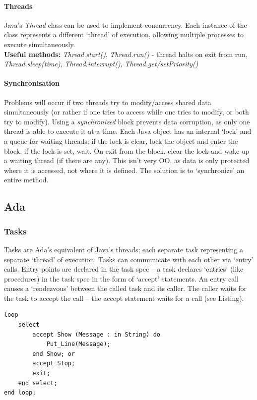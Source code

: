 \documentclass[a4paper,oneside]{report}
\begin{document}
      		\paragraph{Threads} Java's \emph{Thread} class can be used to implement concurrency. Each instance of the class represents a different `thread' of execution, allowing multiple processes to execute simultaneously.\\ 
\textbf{Useful methods:} \emph{Thread.start()}, \emph{Thread.run()} - thread halts on exit from run, \emph{Thread.sleep(time)}, \emph{Thread.interrupt()}, \emph{Thread.get/setPriority()}

      		\paragraph{Synchronisation} Problems will occur if two threads try to modify/access shared data simultaneously (or rather if one tries to access while one tries to modify, or both try to modify). Using a \emph{synchronized} block prevents data corruption, as only one thread is able to execute it at a time. Each Java object has an internal ‘lock’ and a queue for waiting threads; if the lock is clear, lock the object and enter the block, if the lock is set, wait. On exit from the block, clear the lock and wake up a waiting thread (if there are any). This isn't very OO, as data is only protected where it is accessed, not where it is defined. The solution is to `synchronize' an entire method.
      		
    	\subsection{Ada}
    	
      		\subsubsection{Tasks}
      		Tasks are Ada's equivalent of Java's threads; each separate task representing a separate `thread' of execution. Tasks can communicate with each other via `entry' calls. Entry points are declared in the task spec
– a task declares ‘entries’ (like procedures) in the task spec in the form of ‘accept’ statements. An entry call causes a ‘rendezvous’ between the called task and its caller. The caller waits for the task to accept the call – the accept statement waits for a call (see Listing).
         
\begin{lstlisting}[label=some-code,caption=Ada's Accept Statement] 
loop 
	select
		accept Show (Message : in String) do
			Put_Line(Message);
		end Show; or
		accept Stop;
        exit;
	end select;
end loop;
\end{lstlisting}
      		
\end{document}
